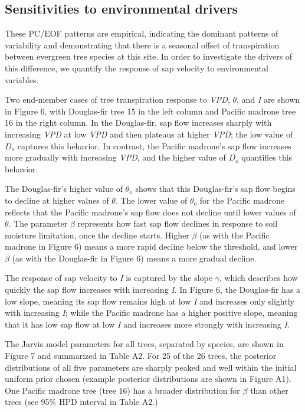 \subsection{Sensitivities to environmental drivers}
These PC/EOF patterns are empirical, indicating the dominant patterns of variability and demonstrating that there is a seasonal offset of transpiration between evergreen tree species at this site.  In order to investigate the drivers of this difference, we quantify the response of sap velocity to environmental variables.

Two end-member cases of tree transpiration response to \textit{VPD}, $\theta$, and \textit{I} are shown in Figure 6, with Douglas-fir tree 15 in the left column and Pacific madrone tree 16 in the right column.  In the Douglas-fir, sap flow increases sharply with increasing \textit{VPD} at low \textit{VPD} and then plateaus at higher \textit{VPD}; the low value of $D_o$ captures this behavior.  In contrast, the Pacific madrone's sap flow increases more gradually with increasing \textit{VPD}, and the higher value of $D_o$ quantifies this behavior.

The Douglas-fir's higher value of $\theta_o$ shows that this Douglas-fir's sap flow begins to decline at higher values of $\theta$.  The lower value of $\theta_o$ for the Pacific madrone reflects that the Pacific madrone's sap flow does not decline until lower values of $\theta$.  The parameter $\beta$ represents how fast sap flow declines in response to soil moisture limitation, once the decline starts.  Higher $\beta$ (as with the Pacific madrone in Figure 6) means a more rapid decline below the threshold, and lower $\beta$ (as with the Douglas-fir in Figure 6) means a more gradual decline.

The response of sap velocity to \textit{I} is captured by the slope $\gamma$, which describes how quickly the sap flow increases with increasing \textit{I}.  In Figure 6, the Douglas-fir has a low slope, meaning its sap flow remains high at low \textit{I} and increases only slightly with increasing \textit{I}; while the Pacific madrone has a higher positive slope, meaning that it has low sap flow at low \textit{I} and increases more strongly with increasing \textit{I}.

The Jarvis model parameters for all trees, separated by species, are shown in Figure 7 and summarized in Table A2.  For 25 of the 26 trees, the posterior distributions of all five parameters are sharply peaked and well within the initial uniform prior chosen (example posterior distributions are shown in Figure A1).  One Pacific madrone tree (tree 16) has a broader distribution for $\beta$ than other trees (see 95\% HPD interval in Table A2.)

